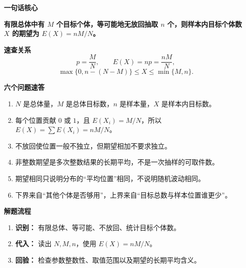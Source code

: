 \clearpage
\begin{summarybox}
	\textbf{\textcolor{CSummary}{一句话核心}}

	\textbf{有限总体中有 $M$ 个目标个体，等可能地无放回抽取 $n$ 个，则样本内目标个体数 $X$ 的期望为 $E(X)=nM/N$。}

	\medskip
	\textbf{\textcolor{CSummary}{速查关系}}
	\[
		p=\frac{M}{N},
		\qquad
		E(X)=np=\frac{nM}{N},
	\]
	\[
		\max\{0,n-(N-M)\}\le X\le\min\{M,n\}.
	\]

	\textbf{\textcolor{CSummary}{六个问题速答}}
	\begin{enumerate}[leftmargin=*, itemsep=0.48em, topsep=0.35em]
		\item $N$ 是总体量，$M$ 是总体目标数，$n$ 是样本量，$X$ 是样本内目标数。
		\item 每个位置贡献 $0$ 或 $1$，且 $E(X_i)=M/N$，所以 $E(X)=\sum E(X_i)=nM/N$。
		\item 不放回使位置一般不独立，但期望相加不要求独立。
		\item 非整数期望是多次整数结果的长期平均，不是一次抽样的可取件数。
		\item 期望相同只说明分布的“平均位置”相同，不说明随机波动相同。
		\item 下界来自“其他个体是否够用”，上界来自“目标总数与样本位置谁更少”。
	\end{enumerate}

	\medskip
	\textbf{\textcolor{CSummary}{解题流程}}
	\begin{enumerate}[leftmargin=*, itemsep=0.45em, topsep=0.35em]
		\item \textbf{识别：} 有限总体、等可能、不放回、统计目标个体数。
		\item \textbf{代入：} 读出 $N,M,n$，使用 $E(X)=nM/N$。
		\item \textbf{回验：} 检查参数整数性、取值范围以及期望的长期平均含义。
	\end{enumerate}
\end{summarybox}
